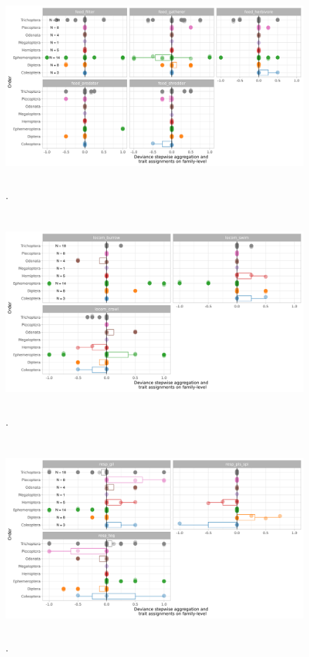 \documentclass{article}
\begin{document}
\begin{figure}[H]
  \centering
  \caption{.}
  \label{fig:trait_dev_stepwise_agg_volt}
  \includegraphics[width=14cm, height=7.5cm]{trait_deviations_stepwise_famlvl_feed.png}
\end{figure}

\begin{figure}[H]
  \centering
  \caption{.}
  \label{fig:trait_dev_stepwise_agg_locom}
  \includegraphics[width=14cm, height=7.5cm]{trait_deviations_stepwise_famlvl_locom.png}
\end{figure}

\begin{figure}[H]
  \centering
  \caption{.}
  \label{fig:trait_dev_stepwise_agg_resp}
  \includegraphics[width=14cm, height=7.5cm]{trait_deviations_stepwise_famlvl_resp.png}
\end{figure}
\end{document}
